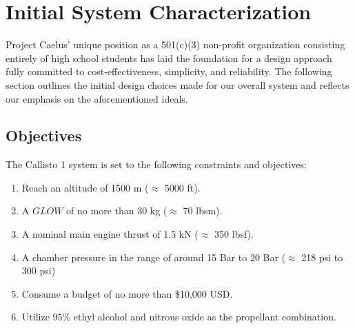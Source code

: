 \documentclass[9pt]{article} %
\numberwithin{equation}{section} %
\begin{document}
\section{Initial System Characterization}
\hspace{\parindent}  Project Caelus' unique position as a 501(c)(3) non-profit organization consisting entirely of high school students has laid the foundation for a design approach fully committed to cost-effectiveness, simplicity, and reliability. The following section outlines the initial design choices made for our overall system and reflects our emphasis on the aforementioned ideals.
\subsection{Objectives}
The Callisto 1 system is set to the following constraints and objectives:
\begin{enumerate}
\item Reach an altitude of 1500 m ($\approx$ 5000 ft).
\item A $GLOW$ of no more than 30 kg ($\approx$ 70 lbsm).
\item A nominal main engine thrust of 1.5 kN ($\approx$ 350 lbsf).
\item A chamber pressure in the range of around 15 Bar to 20 Bar ($\approx$ 218 psi to 300 psi)
\item Consume a budget of no more than \$10,000 USD.
\item Utilize $95\%$ ethyl alcohol and nitrous oxide as the propellant combination.
\end{enumerate}
\end{document}
